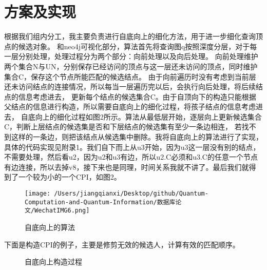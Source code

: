 \documentclass[UTF8]{ctexart}
\begin{document}
\section{方案及实现}
\par{
根据我们组内分工，我主要负责进行自底向上的细化方法，用于进一步细化查询顶点的候选对象。
和neo4j可视化部分，算法首先将查询图q按照深度分层，对于每一层分别处理，处理过程分为两个部分：向前处理以及向后处理。
向前处理维护两个集合N与UN，分别保存已经访问的顶点与这一层还未访问的顶点，同时维护集合C，保存这个节点所能匹配的候选结点。
由于向前遍历时没有考虑到当前层还未访问结点的连接情况，所以每当一层遍历完以后，会执行向后处理，将后续结点的信息考虑进去，
更新每个结点的候选集合C。由于自顶向下的构造只能根据父结点的信息进行构造，所以需要自底向上的细化过程，将孩子结点的信息考虑进去，
自底向上的细化过程如图2所示。算法从最低层开始，逐层向上更新候选集合C，判断上层结点的候选集是否和下层结点的候选集有至少一条边相连，
若找不到这样的一条边，则把该结点从候选集中删除。我将自底向上的算法进行了实现，具体的代码实现见附录1。我们自下而上从u3开始，因为u3这一层没有别的结点，不需要处理，然后看u2，因为u2和u3有边，所以u2.C必须和u3.C的任意一个节点有边连接，所以去掉v8，接下来也是同理，时间关系我就不讲了。最后我们就得到了一个较为小的一个CPI，如图2。

\begin{figure}[h]
	\centering
	\texttt{[image: /Users/jiangqianxi/Desktop/github/Quantum-Computation-and-Quantum-Information/数据库论文/WechatIMG6.png]}
	\caption{自底向上的算法}
	\end{figure}

}
\par{
	下面是构造CPI的例子，主要是修剪无效的候选人，计算有效的匹配顺序。
	\begin{figure}[htbp]
		\centering
		\quad
		\quad
		\quad
		\caption{ 自底向上构造过程}
		\end{figure}
	
}
\end{document}
